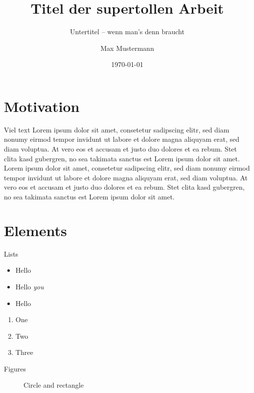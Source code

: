 \documentclass[compress]{beamer}
\title{Titel der supertollen Arbeit}
\subtitle{Untertitel -- wenn man's denn braucht}
\date{\today}
\author{Max Mustermann}
\institute{Institut für so und so\\Universtität Bla}
\begin{document}
\maketitle


\section{Motivation}

\begin{frame}{Viel text}
Lorem ipsum dolor sit amet, consetetur sadipscing elitr, sed diam nonumy eirmod
tempor invidunt ut labore et dolore magna aliquyam erat, sed diam voluptua. At
vero eos et accusam et justo duo dolores et ea rebum. Stet clita kasd gubergren,
no sea takimata sanctus est Lorem ipsum dolor sit amet. Lorem ipsum dolor sit
amet, consetetur sadipscing elitr, sed diam nonumy eirmod tempor invidunt ut
labore et dolore magna aliquyam erat, sed diam voluptua. At vero eos et accusam
et justo duo dolores et ea rebum. Stet clita kasd gubergren, no sea takimata
sanctus est Lorem ipsum dolor sit amet.
\end{frame}


\section{Elements}

\begin{frame}{Lists}
  \begin{itemize}
    \item Hello
    \item Hello \emph{you}
    \item Hello
  \end{itemize}

  \begin{enumerate}
    \item One
    \item Two
    \item Three
  \end{enumerate}
\end{frame}

\begin{frame}{Figures}
  \begin{figure}
    \caption{Circle and rectangle}
  \end{figure}
\end{frame}
\end{document}

